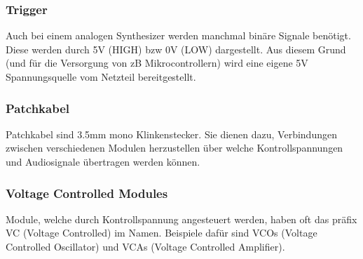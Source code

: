 \subsubsection{Trigger}
\label{sec:org2a83886}
Auch bei einem analogen Synthesizer werden manchmal binäre Signale benötigt. Diese werden durch 5V (HIGH) bzw 0V (LOW) dargestellt. Aus diesem Grund (und für die Versorgung von zB Mikrocontrollern) wird eine eigene 5V Spannungsquelle vom Netzteil bereitgestellt.

\subsubsection{Patchkabel}
\label{sec:org6e3052c}
Patchkabel sind 3.5mm mono Klinkenstecker. Sie dienen dazu, Verbindungen zwischen verschiedenen Modulen herzustellen über welche Kontrollspannungen und Audiosignale übertragen werden können.

\subsubsection{Voltage Controlled Modules}
\label{sec:org96d5b78}
Module, welche durch Kontrollspannung angesteuert werden, haben oft das präfix VC (Voltage Controlled) im Namen. Beispiele dafür sind VCOs (Voltage Controlled Oscillator) und VCAs (Voltage Controlled Amplifier).
